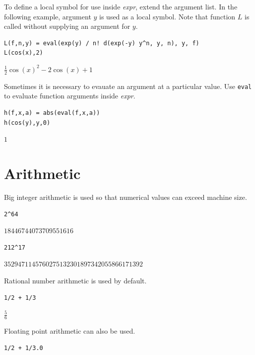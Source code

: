 \documentclass[12pt]{article}
\begin{document}
\bigskip
To define a local symbol for use inside {\it expr}, extend the argument list.
In the following example, argument $y$ is used as a local symbol.
Note that function $L$ is called without supplying an argument for $y$.

{\color{blue}
\begin{verbatim}
L(f,n,y) = eval(exp(y) / n! d(exp(-y) y^n, y, n), y, f)
L(cos(x),2)
\end{verbatim}
}

$\displaystyle \tfrac{1}{2}\cos(x)^2-2\cos(x)+1$

\bigskip
Sometimes it is necessary to evauate an argument at a particular value.
Use \verb$eval$ to evaluate function arguments inside {\it expr}.

{\color{blue}
\begin{verbatim}
h(f,x,a) = abs(eval(f,x,a))
h(cos(y),y,0)
\end{verbatim}}

$1$

\newpage

\section{Arithmetic}

Big integer arithmetic is used so that numerical values can
exceed machine size.

{\color{blue}
\begin{verbatim}
2^64
\end{verbatim}
}

$\displaystyle 18446744073709551616$

{\color{blue}
\begin{verbatim}
212^17
\end{verbatim}
}

$\displaystyle 3529471145760275132301897342055866171392$

\bigskip

Rational number arithmetic is used by default.

{\color{blue}
\begin{verbatim}
1/2 + 1/3
\end{verbatim}
}

$\displaystyle \tfrac{5}{6}$

\bigskip

Floating point arithmetic can also be used.

{\color{blue}
\begin{verbatim}
1/2 + 1/3.0
\end{verbatim}
}
\end{document}
